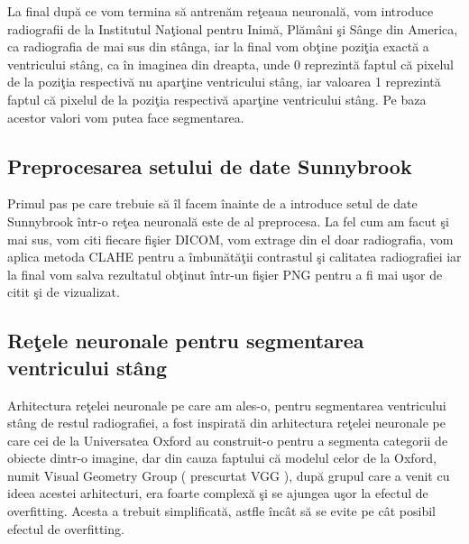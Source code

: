 \par

La final dup\u{a} ce vom termina s\u{a} antren\u{a}m re\c{t}eaua neuronal\u{a}, vom introduce radiografii de la Institutul Na\c{t}ional pentru Inim\u{a}, Pl\u{a}m\^{a}ni \c{s}i S\^{a}nge din America, ca radiografia de mai sus din st\^{a}nga, iar la final vom ob\c{t}ine pozi\c{t}ia exact\u{a} a ventricului st\^{a}ng, ca \^{i}n imaginea din dreapta, unde 0 reprezint\u{a} faptul c\u{a} pixelul de la pozi\c{t}ia respectiv\u{a} nu apar\c{t}ine ventricului st\^{a}ng, iar valoarea 1 reprezint\u{a} faptul c\u{a} pixelul de la pozi\c{t}ia respectiv\u{a} apar\c{t}ine ventricului st\^{a}ng. Pe baza acestor valori vom putea face segmentarea.

\subsection{Preprocesarea setului de date Sunnybrook}

Primul pas pe care trebuie s\u{a} \^{i}l facem \^{i}nainte de a introduce setul de date Sunnybrook \^{i}ntr-o re\c{t}ea neuronal\u{a} este de al preprocesa. La fel cum am facut \c{s}i mai sus, vom citi fiecare fi\c{s}ier DICOM, vom extrage din el doar radiografia, vom aplica metoda CLAHE pentru a \^{i}mbun\u{a}t\u{a}\c{t}ii contrastul \c{s}i calitatea radiografiei iar la final vom salva rezultatul ob\c{t}inut \^{i}ntr-un fi\c{s}ier PNG pentru a fi mai u\c{s}or de citit \c{s}i de vizualizat.

\subsection{Re\c{t}ele neuronale pentru segmentarea ventricului st\^{a}ng}

Arhitectura re\c{t}elei neuronale pe care am ales-o, pentru segmentarea ventricului st\^{a}ng de restul radiografiei, a fost inspirat\u{a} din arhitectura re\c{t}elei neuronale pe care cei de la Universatea Oxford au construit-o pentru a segmenta categorii de obiecte dintr-o imagine, dar din cauza faptului c\u{a} modelul celor de la Oxford, numit Visual Geometry Group ( prescurtat VGG ), dup\u{a} grupul care a venit cu ideea acestei arhitecturi, era foarte complex\u{a} \c{s}i se ajungea u\c{s}or la efectul de overfitting. Acesta a trebuit simplificat\u{a,} astfle \^{i}nc\^{a}t s\u{a} se evite pe c\^{a}t posibil efectul de overfitting.

\par

